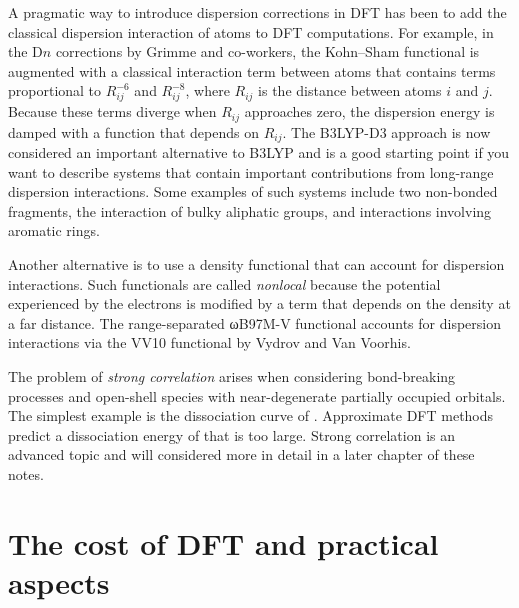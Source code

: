 \documentclass[../Main/chem371-notes.tex]{subfiles}
\begin{document}
A pragmatic way to introduce dispersion corrections in DFT has been to add the classical dispersion interaction of atoms to DFT computations.
For example, in the D$n$ corrections by Grimme and co-workers, the Kohn--Sham functional is augmented with a classical interaction term between atoms that contains terms proportional to $R_{ij}^{-6}$ and $R_{ij}^{-8}$, where $R_{ij}$ is the distance between atoms $i$ and $j$.
Because these terms diverge when $R_{ij}$ approaches zero, the dispersion energy is damped with a function that depends on $R_{ij}$.
The B3LYP-D3 approach is now considered an important alternative to B3LYP and is a good starting point if you want to describe systems that contain important contributions from long-range dispersion interactions.
Some examples of such systems include two non-bonded fragments, the interaction of bulky aliphatic groups, and interactions involving aromatic rings.

Another alternative is to use a density functional that can account for dispersion interactions.
Such functionals are called \emph{nonlocal} because the potential experienced by the electrons is modified by a term that depends on the density at a far distance.
The range-separated ωB97M-V functional accounts for dispersion interactions via the VV10 functional by Vydrov and Van Voorhis.

The problem of \emph{strong correlation} arises when considering bond-breaking processes and open-shell species with near-degenerate partially occupied orbitals.
The simplest example is the dissociation curve of .
Approximate DFT methods predict a dissociation energy of  that is too large.
Strong correlation is an advanced topic and will considered more in detail in a later chapter of these notes.

\section{The cost of DFT and practical aspects}
\end{document}

